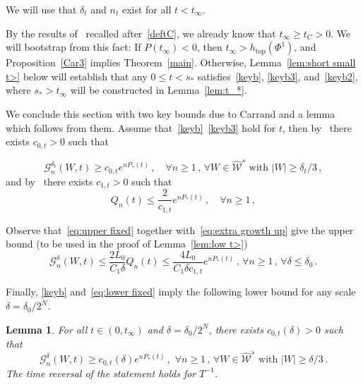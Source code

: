 \documentclass[10pt]{amsart}
\newtheorem{lemm}[theo]{Lemma}\newtheorem{prop}[theo]{Proposition}\newtheorem{coro}[theo]{Corollary}\newtheorem{conj}[theo]{Conjecture}
\theoremstyle{definition}\newtheorem{defi}[theo]{Definition}\newtheorem{rema}[theo]{Remark}\newtheorem{exam}[theo]{Example}\newtheorem{exem}[theo]{Example}\newtheorem{nota}[theo]{Notation}
\newcommand{\cG}{\mathcal{G}}
\newcommand{\cW}{\mathcal{W}}
\newcommand{\hW}{\widehat{\cW}}
\newcommand{\htop}{h_{\scriptstyle{\text{top}}}}
\let\oldforall\forall
\renewcommand*{\forall}{\mathrel{\oldforall}}
\begin{document}
We will use that $\delta_t$ and $n_t$ exist for all $t< t_\infty$.

By the results of~\cite{Ca} recalled after~\eqref{deftC}, we already know that $t_\infty\ge t_C>0$. We will bootstrap from this fact: If $P(t_\infty)<0$, then $t_\infty >\htop(\Phi^1)$, and Proposition~\ref{Car3} implies Theorem~\ref{main}. Otherwise, Lemma~\ref{lem:short small t>} below will establish that any $0\le t<s_*$ satisfies~\eqref{keyb}, \eqref{keyb3}, and~\eqref{keyb2}, where $s_*>t_\infty$ will be constructed in Lemma~\ref{lem:t_*}.


We conclude this section with two key bounds due to Carrand and a lemma which follows from them. Assume that~\eqref{keyb}~\eqref{keyb3} hold for $t$, then by~\cite[Prop 3.7]{Ca} there exists $c_{0, t}>0$ such that

\begin{equation}\label{eq:lower fixed}
\cG_n^{\delta_t}(W,t) \ge c_{0,t} e^{n P_*(t)}\,, \quad \forall n \ge 1\,,\, \forall W\in \hW^s \text{ with } |W| \ge \delta_t/3\,,
\end{equation}
and by~\cite[Proposition~3.10]{Ca} there exists $c_{1,t}>0$ such that
\begin{equation}\label{eq:upper fixed}
Q_n(t) \le \frac 2 {c_{1,t}} e^{n P_*(t)}\,, \quad \forall n \ge 1 \,,
\end{equation}


Observe that~\eqref{eq:upper fixed} together with~\eqref{eq:extra growth up} give the upper bound (to be used in the proof of Lemma~\ref{lem:low t>})
\begin{equation}\label{eq:upper}
\cG_n^\delta(W,t) \le { \frac{ 2 L_0}{C_1 \delta} } Q_n(t)
\le { \frac{ 4 L_0}{C_1 \delta c_{1,t}} } e^{n P_*(t)}
\,,\, \forall n \ge 1\,, \, \forall \delta \le \delta_0 \,.
\end{equation}




Finally, \eqref{keyb} and~\eqref{eq:lower fixed} imply the following lower bound for any scale $\delta = \delta_0/2^N$.

\begin{lemm}\label{thelabel}
For all $t \in (0, t_\infty)$ and $\delta =\delta_0/2^N$, there exists $c_{0,t}(\delta)>0$ such that
\begin{equation}\label{eq:lower fixed'}
\cG_n^{ \delta}(W,t) \ge c_{0,t}(\delta) e^{n P_*(t)}\,, \,\, \forall n \ge 1\,,\, \forall W\in \hW^s \text{ with } |W| \ge \delta/3\,.
\end{equation}
The time reversal of the statement holds for $T^{-1}$.
\end{lemm}
\end{document}
